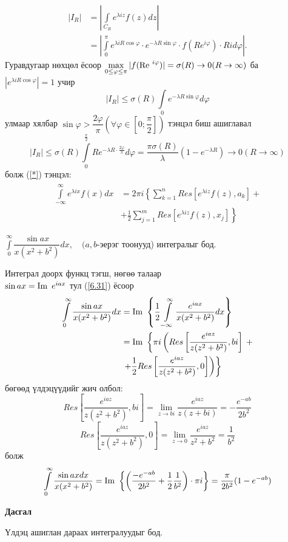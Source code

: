 \begin{prf}
\begin{align*}
    |I_R|&=\left|\int\limits_{C_R}e^{\lambda iz}f(z)dz\right| \\ &=\left|\int\limits_0^\pi e^{\lambda i R\cos \varphi}\cdot e^{-\lambda R\sin \varphi}\cdot f(Re^{i\varphi})\cdot Rid\varphi\right|.
\end{align*}
Гуравдугаар нөхцөл ёсоор $\max\limits_{0\leq \varphi \leq \pi}|f(\operatorname{\textrm{\normalfont{Re }}}^{i\varphi})|=\sigma(R)\rightarrow 0 (R\rightarrow \infty)$ ба  $|e^{\lambda iR\cos \varphi}|=1$ учир 
$$|I_R|\leq \sigma (R)\int\limits_0 e^{-\lambda R\sin \varphi}d\varphi $$
улмаар хялбар $\sin \varphi >\dfrac{2\varphi}{\pi} \left(\forall \varphi \in\left[0;\dfrac{\pi}{2}\right]\right)$ тэнцэл биш ашиглавал 
$$|I_R|\leq \sigma (R)\int\limits_0^{\frac{\pi}{2}}Re^{-\lambda R\cdot\frac{2\varphi}{\pi}}d\varphi=\frac{\pi \sigma(R)}{\lambda}(1-e^{-\lambda R})\rightarrow 0 (R\rightarrow \infty)$$ 
болж (\ref{*}) тэнцэл:
\begin{eqnarray}\label{6.31}
\begin{split}
    \int\limits_{-\infty}^\infty e^{\lambda ix}f(x)dx& =2\pi i \left\{\sum\limits_{k=1}^nRes[e^{\lambda iz}f(z),a_k]+\right.\\
    &\left.+\frac{1}{2}\sum\limits_{j=1}^m Res[e^{\lambda iz}f(z), x_j]\right\}
\end{split}
\end{eqnarray} 
\begin{exm}
$\int\limits_{0}^\infty \dfrac{\sin ax}{x(x^2+b^2)}dx, \quad (a,b$-эерэг тоонууд) интегралыг бод. 
\end{exm}
 \end{prf}
\begin{sol}
Интеграл доорх функц тэгш, нөгөө талаар \\ $\sin ax=\operatorname{\textrm{\normalfont{Im }}} e^{iax}$ тул (\ref{6.31}) ёсоор 
\begin{align*}
    \int\limits_0^\infty \frac{\sin ax}{x(x^2+b^2)}dx&=\operatorname{\textrm{\normalfont{Im }}} \left\{\frac{1}{2}\int\limits_{-\infty}^\infty \frac{e^{iax}}{x(x^2+b^2)}dx\right\} \\
    &=\operatorname{\textrm{\normalfont{Im }}} \left\{\pi i\left(Res\left[\frac{e^{iaz}}{z(z^2+b^2)}, bi\right]\right.\right.+\\
    &\left.\left.+\frac{1}{2}Res \left[\frac{e^{iaz}}{z(z^2+b^2)},0\right]\right)\right\}
\end{align*} бөгөөд үлдэцүүдийг жич олбол:
$$Res\left[\frac{e^{iaz}}{z(z^2+b^2)}, bi\right] =\lim\limits_{z\rightarrow bi}\frac{e^{iaz}}{z(z+bi)}=-\frac{e^{-ab}}{2b^2}$$
$$Res\left[\frac{e^{iaz}}{z(z^2+b^2)}, 0\right] =\lim\limits_{z\rightarrow 0}\frac{e^{iaz}}{z^2+b^2}=\frac{1}{b^2}$$ болж 
$$\int\limits_0^\infty \frac{\sin ax dx}{x(x^2+b^2)}=\operatorname{\textrm{\normalfont{Im }}}\left\{\left(\frac{-e^{-ab}}{2b^2}+\frac{1}{2}\frac{1}{b^2}\right)\cdot \pi i\right\}=\frac{\pi}{2b^2}(1-e^{-ab})$$
\end{sol}
\begin{center}
   \textbf{ Дасгал}
\end{center}
Үлдэц ашиглан дараах интегралуудыг бод.

